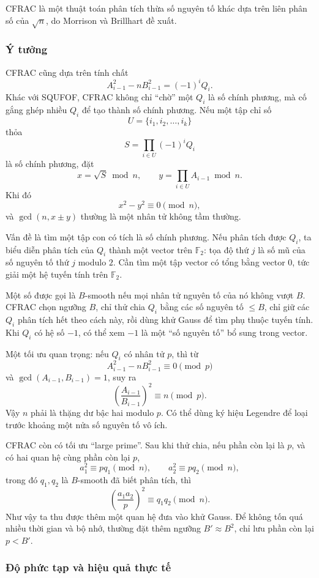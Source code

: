 \documentclass[11pt]{article}
\begin{document}
CFRAC là một thuật toán phân tích thừa số nguyên tố khác dựa trên liên phân số
của \(\sqrt n\), do Morrison và Brillhart đề xuất.

\subsubsection{Ý tưởng}

CFRAC cũng dựa trên tính chất
\[
  A_{i-1}^2-nB_{i-1}^2=(-1)^iQ_i.
\]
Khác với SQUFOF, CFRAC không chỉ ``chờ'' một \(Q_i\) là số chính phương, mà cố
gắng ghép nhiều \(Q_i\) để tạo thành số chính phương. Nếu một tập chỉ số
\[
  U=\{i_1,i_2,\ldots,i_k\}
\]
thỏa
\[
  S=\prod_{i\in U}(-1)^iQ_i
\]
là số chính phương, đặt
\[
  x=\sqrt S\bmod n,\qquad
  y=\prod_{i\in U}A_{i-1}\bmod n.
\]
Khi đó
\[
  x^2-y^2\equiv 0\pmod n,
\]
và \(\gcd(n,x\pm y)\) thường là một nhân tử không tầm thường.

Vấn đề là tìm một tập con có tích là số chính phương. Nếu phân tích được
\(Q_i\), ta biểu diễn phân tích của \(Q_i\) thành một vector trên \(\mathbb F_2\):
tọa độ thứ \(j\) là số mũ của số nguyên tố thứ \(j\) modulo \(2\). Cần tìm một
tập vector có tổng bằng vector \(0\), tức giải một hệ tuyến tính trên
\(\mathbb F_2\).

Một số được gọi là \(B\)-smooth nếu mọi nhân tử nguyên tố của nó không vượt
\(B\). CFRAC chọn ngưỡng \(B\), chỉ thử chia \(Q_i\) bằng các số nguyên tố
\(\le B\), chỉ giữ các \(Q_i\) phân tích hết theo cách này, rồi dùng khử Gauss
để tìm phụ thuộc tuyến tính. Khi \(Q_i\) có hệ số \(-1\), có thể xem \(-1\) là
một ``số nguyên tố'' bổ sung trong vector.

Một tối ưu quan trọng: nếu \(Q_i\) có nhân tử \(p\), thì từ
\[
  A_{i-1}^2-nB_{i-1}^2\equiv 0\pmod p
\]
và \(\gcd(A_{i-1},B_{i-1})=1\), suy ra
\[
  \left(\frac{A_{i-1}}{B_{i-1}}\right)^2\equiv n\pmod p.
\]
Vậy \(n\) phải là thặng dư bậc hai modulo \(p\). Có thể dùng ký hiệu Legendre
để loại trước khoảng một nửa số nguyên tố vô ích.

CFRAC còn có tối ưu ``large prime''. Sau khi thử chia, nếu phần còn lại là
\(p\), và có hai quan hệ cùng phần còn lại \(p\),
\[
  a_1^2\equiv p q_1\pmod n,\qquad
  a_2^2\equiv p q_2\pmod n,
\]
trong đó \(q_1,q_2\) là \(B\)-smooth đã biết phân tích, thì
\[
  \left(\frac{a_1a_2}{p}\right)^2\equiv q_1q_2\pmod n.
\]
Như vậy ta thu được thêm một quan hệ đưa vào khử Gauss. Để không tốn quá nhiều
thời gian và bộ nhớ, thường đặt thêm ngưỡng \(B'\approx B^2\), chỉ lưu phần còn
lại \(p<B'\).

\subsubsection{Độ phức tạp và hiệu quả thực tế}
\end{document}
